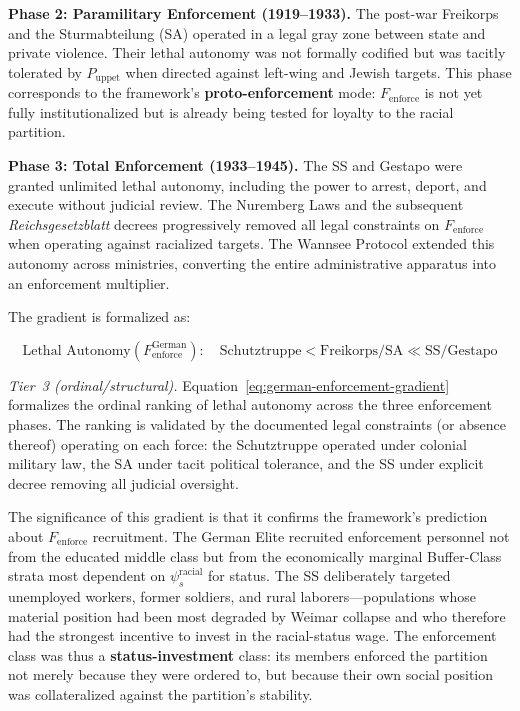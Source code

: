 \textbf{Phase 2: Paramilitary Enforcement (1919--1933).} The post-war Freikorps and the Sturmabteilung (SA) operated in a legal gray zone between state and private violence. Their lethal autonomy was not formally codified but was tacitly tolerated by $P_{\text{uppet}}$ when directed against left-wing and Jewish targets. This phase corresponds to the framework's \textbf{proto-enforcement} mode: $F_{\text{enforce}}$ is not yet fully institutionalized but is already being tested for loyalty to the racial partition.

\textbf{Phase 3: Total Enforcement (1933--1945).} The SS and Gestapo were granted unlimited lethal autonomy, including the power to arrest, deport, and execute without judicial review. The Nuremberg Laws and the subsequent \textit{Reichsgesetzblatt} decrees progressively removed all legal constraints on $F_{\text{enforce}}$ when operating against racialized targets. The Wannsee Protocol extended this autonomy across ministries, converting the entire administrative apparatus into an enforcement multiplier.

The gradient is formalized as:

\begin{equation}\label{eq:german-enforcement-gradient}
\text{Lethal Autonomy}(F_{\text{enforce}}^{\text{German}}) : \quad \text{Schutztruppe} < \text{Freikorps/SA} \ll \text{SS/Gestapo}
\end{equation}

\noindent\textit{Tier~3 (ordinal/structural).} Equation~\ref{eq:german-enforcement-gradient} formalizes the ordinal ranking of lethal autonomy across the three enforcement phases. The ranking is validated by the documented legal constraints (or absence thereof) operating on each force: the Schutztruppe operated under colonial military law, the SA under tacit political tolerance, and the SS under explicit decree removing all judicial oversight.

The significance of this gradient is that it confirms the framework's prediction about $F_{\text{enforce}}$ recruitment. The German Elite recruited enforcement personnel not from the educated middle class but from the economically marginal Buffer-Class strata most dependent on $\psi_s^{\text{racial}}$ for status. The SS deliberately targeted unemployed workers, former soldiers, and rural laborers---populations whose material position had been most degraded by Weimar collapse and who therefore had the strongest incentive to invest in the racial-status wage. The enforcement class was thus a \textbf{status-investment} class: its members enforced the partition not merely because they were ordered to, but because their own social position was collateralized against the partition's stability.

